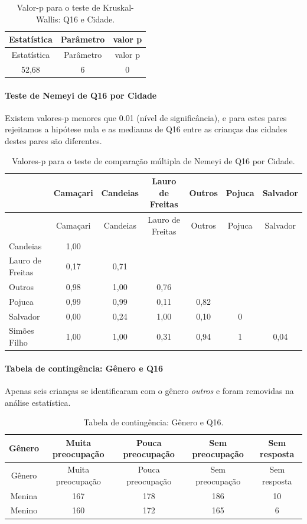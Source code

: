 \documentclass[]{article}
\let\oldparagraph\paragraph
\renewcommand{\paragraph}[1]{\oldparagraph{#1}\mbox{}}
\begin{document}
\begin{longtable}[]{@{}ccc@{}}
\caption{\label{tab:unnamed-chunk-137}Valor-p para o teste de Kruskal-Wallis: Q16 e Cidade.}\tabularnewline
\toprule
Estatística & Parâmetro & valor p\tabularnewline
\midrule
\endfirsthead
\toprule
Estatística & Parâmetro & valor p\tabularnewline
\midrule
\endhead
52,68 & 6 & 0\tabularnewline
\bottomrule
\end{longtable}

\hypertarget{teste-de-nemeyi-de-q16-por-cidade}{%
\paragraph{Teste de Nemeyi de Q16 por Cidade}\label{teste-de-nemeyi-de-q16-por-cidade}}

Existem valores-p menores que 0.01 (nível de significância), e para estes pares rejeitamos a hipótese nula e as medianas de Q16 entre as crianças das cidades destes pares são diferentes.

\begin{longtable}[]{@{}lcccccc@{}}
\caption{\label{tab:unnamed-chunk-139}Valores-p para o teste de comparação múltipla de Nemeyi de Q16 por Cidade.}\tabularnewline
\toprule
& Camaçari & Candeias & Lauro de Freitas & Outros & Pojuca & Salvador\tabularnewline
\midrule
\endfirsthead
\toprule
& Camaçari & Candeias & Lauro de Freitas & Outros & Pojuca & Salvador\tabularnewline
\midrule
\endhead
Candeias & 1,00 & & & & &\tabularnewline
Lauro de Freitas & 0,17 & 0,71 & & & &\tabularnewline
Outros & 0,98 & 1,00 & 0,76 & & &\tabularnewline
Pojuca & 0,99 & 0,99 & 0,11 & 0,82 & &\tabularnewline
Salvador & 0,00 & 0,24 & 1,00 & 0,10 & 0 &\tabularnewline
Simões Filho & 1,00 & 1,00 & 0,31 & 0,94 & 1 & 0,04\tabularnewline
\bottomrule
\end{longtable}

\cleardoublepage

\hypertarget{tabela-de-continguxeancia-guxeanero-e-q16}{%
\paragraph{Tabela de contingência: Gênero e Q16}\label{tabela-de-continguxeancia-guxeanero-e-q16}}

Apenas seis crianças se identificaram com o gênero \emph{outros} e foram removidas na análise estatística.

\begin{longtable}[]{@{}ccccc@{}}
\caption{\label{tab:unnamed-chunk-140}Tabela de contingência: Gênero e Q16.}\tabularnewline
\toprule
Gênero & Muita preocupação & Pouca preocupação & Sem preocupação & Sem resposta\tabularnewline
\midrule
\endfirsthead
\toprule
Gênero & Muita preocupação & Pouca preocupação & Sem preocupação & Sem resposta\tabularnewline
\midrule
\endhead
Menina & 167 & 178 & 186 & 10\tabularnewline
Menino & 160 & 172 & 165 & 6\tabularnewline
\bottomrule
\end{longtable}
\end{document}
